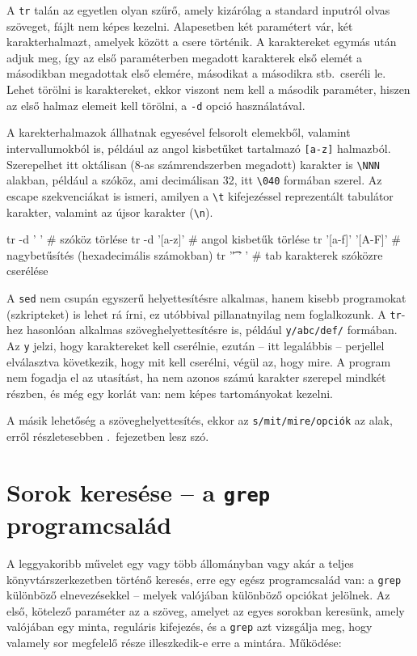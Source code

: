 A \texttt{tr} talán az egyetlen olyan szűrő, amely kizárólag a standard inputról
olvas szöveget, fájlt nem képes kezelni. Alapesetben két paramétert vár, két
karakterhalmazt, amelyek között a csere történik. A karaktereket egymás után
adjuk meg, így az első paraméterben megadott karakterek első elemét a másodikban
megadottak első elemére, másodikat a másodikra stb.\ cseréli le. Lehet törölni
is karaktereket, ekkor viszont nem kell a második paraméter, hiszen az első
halmaz elemeit kell törölni, a \texttt{-d} opció használatával.

A karekterhalmazok állhatnak egyesével felsorolt elemekből, valamint
intervallumokból
is, például az angol kisbetűket tartalmazó \texttt{[a-z]} halmazból. Szerepelhet
itt oktálisan (8-as számrendszerben megadott) karakter is \verb|\NNN| alakban,
például a szóköz, ami decimálisan 32, itt \verb|\040| formában szerel. Az escape
szekvenciákat is ismeri, amilyen a \verb|\t| kifejezéssel reprezentált tabulátor
karakter, valamint az újsor karakter (\verb|\n|).

\begin{VerbExample}
tr -d ' '            # szóköz törlése
tr -d '[a-z]'        # angol kisbetűk törlése
tr '[a-f]' '[A-F]'   # nagybetűsítés (hexadecimális számokban)
tr '\t' ' '          # tab karakterek szóközre cserélése
\end{VerbExample}

A \texttt{sed} nem csupán egyszerű helyettesítésre alkalmas, hanem kisebb
programokat (szkripteket) is lehet rá írni, ez utóbbival pillanatnyilag nem
foglalkozunk. A \texttt{tr}-hez hasonlóan alkalmas szöveghelyettesítésre is,
például \texttt{y/abc/def/} formában. Az \texttt{y} jelzi, hogy karaktereket
kell cserélnie, ezután -- itt legalábbis -- perjellel elválasztva következik,
hogy mit kell cserélni, végül az, hogy mire. A program nem fogadja el az
utasítást, ha nem azonos számú karakter szerepel mindkét részben, és még egy
korlát van: nem képes tartományokat kezelni.

A másik lehetőség a szöveghelyettesítés, ekkor az \texttt{s/mit/mire/opciók} az
alak, erről részletesebben .\ fejezetben lesz szó.



\section{Sorok keresése -- a \texttt{grep} programcsalád}
\label{sec:filters-grep}

A leggyakoribb művelet egy vagy több állományban vagy akár a teljes
könyvtárszerkezetben történő keresés, erre egy egész programcsalád van: a
\texttt{grep} különböző elnevezésekkel -- melyek valójában különböző opciókat
jelölnek. Az első, kötelező paraméter az a szöveg, amelyet az egyes sorokban
keresünk, amely valójában egy minta, reguláris kifejezés, és a \texttt{grep} azt
vizsgálja meg, hogy valamely sor megfelelő része illeszkedik-e erre a
mintára. Működése:\\


